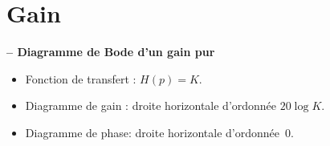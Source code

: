\section{Gain}
\begin{resultat}\textbf{\textsf{\small -- Diagramme de Bode d'un gain pur}} ~\\



\noindent\begin{minipage}[c]{.53\linewidth}
\begin{itemize}
\item Fonction de transfert : $H(p)=K$.
\item Diagramme de gain : droite horizontale d'ordonnée $20 \log K$.
\item Diagramme de phase: droite horizontale d'ordonnée~0\degre.
\end{itemize}
\end{minipage} \hfill
\begin{minipage}[c]{.45\linewidth}

\end{minipage}
\end{resultat}

\vspace{-.8cm}


